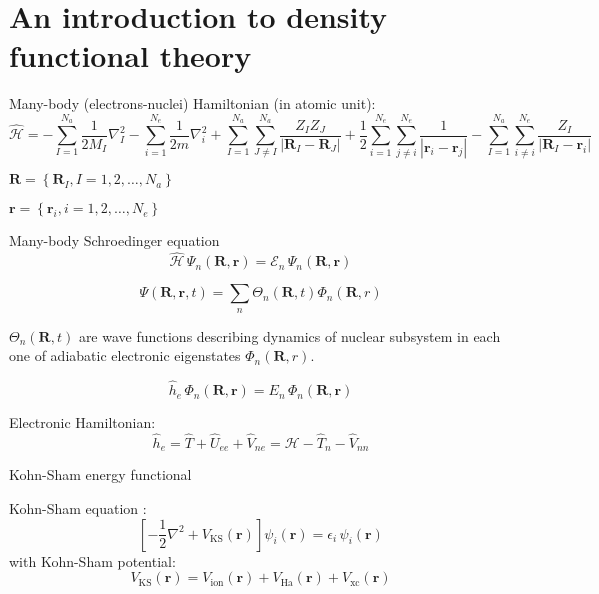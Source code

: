 \chapter{An introduction to density functional theory}

Many-body (electrons-nuclei) Hamiltonian (in atomic unit):
\begin{equation}
\hat{\mathcal{H}} =
- \sum_{I=1}^{N_{a}} \frac{1}{2M_{I}} \nabla^{2}_{I}
- \sum_{i=1}^{N_{e}} \frac{1}{2m} \nabla^{2}_{i}
+ \sum_{I=1}^{N_{a}} \sum_{J \neq I}^{N_{a}} \frac{Z_{I} Z_{J}}{\left| \mathbf{R}_{I} - \mathbf{R}_{J} \right|}
+ \frac{1}{2} \sum_{i=1}^{N_{e}} \sum_{j \neq i}^{N_{e}} \frac{1}{\left| \mathbf{r}_{i} - \mathbf{r}_{j} \right|}
- \sum_{I=1}^{N_{a}} \sum_{i \neq i}^{N_{e}} \frac{Z_{I}}{\left| \mathbf{R}_{I} - \mathbf{r}_{i} \right|}
\end{equation}

$\mathbf{R} = \left\{ \mathbf{R}_{I}, I=1,2,\ldots,N_{a} \right\}$

$\mathbf{r} = \left\{ \mathbf{r}_{i}, i=1,2,\ldots,N_{e} \right\}$


Many-body Schroedinger equation
\begin{equation}
\hat{\mathcal{H}}\, \Psi_{n}(\mathbf{R},\mathbf{r}) = \mathcal{E}_{n}\, \Psi_{n}(\mathbf{R},\mathbf{r})
\end{equation}


\begin{equation}
\Psi(\mathbf{R},\mathbf{r},t) = \sum_{n} \Theta_{n}(\mathbf{R},t) \Phi_{n}(\mathbf{R},r)
\end{equation}


$\Theta_{n}(\mathbf{R},t)$ are wave functions describing dynamics of nuclear subsystem in each one of
adiabatic electronic eigenstates $\Phi_{n} (\mathbf{R},r)$.

\begin{equation}
\hat{h}_{e} \, \Phi_{n}(\mathbf{R},\mathbf{r}) = E_{n}\,\Phi_{n}(\mathbf{R},\mathbf{r})
\end{equation}

Electronic Hamiltonian:
\begin{equation}
\hat{h}_{e} = \hat{T} + \hat{U}_{ee} + \hat{V}_{ne} = \mathcal{H} - \hat{T}_{n} - \hat{V}_{nn}
\end{equation}


Kohn-Sham energy functional 

Kohn-Sham equation \cite{Kohn1965} :
\begin{equation}
\left[ -\frac{1}{2}\nabla^2 + V_{\mathrm{KS}}(\mathbf{r})\right]
\psi_{i}(\mathbf{r}) = \epsilon_{i} \, \psi_{i}(\mathbf{r})
\end{equation}
with Kohn-Sham potential:
\begin{equation}
V_{\mathrm{KS}}(\mathbf{r}) = V_{\mathrm{ion}}(\mathbf{r}) +
V_{\mathrm{Ha}}(\mathbf{r}) + V_{\mathrm{xc}}(\mathbf{r})
\end{equation}

